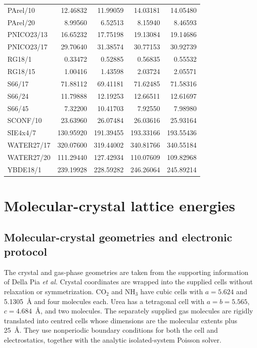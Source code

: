 \documentclass[10pt,a4paper]{article}
\begin{document}
{\begin{longtable}{@{}lrrrr@{}}
PArel/10 & 12.46832 & 11.99059 & 14.03181 & 14.05480 \\
PArel/20 & 8.99560 & 6.52513 & 8.15940 & 8.46593 \\
PNICO23/13 & 16.65232 & 17.75198 & 19.13084 & 19.14686 \\
PNICO23/17 & 29.70640 & 31.38574 & 30.77153 & 30.92739 \\
RG18/1 & 0.33472 & 0.52885 & 0.56835 & 0.55532 \\
RG18/15 & 1.00416 & 1.43598 & 2.03724 & 2.05571 \\
S66/17 & 71.88112 & 69.41181 & 71.62485 & 71.58316 \\
S66/24 & 11.79888 & 12.19253 & 12.66511 & 12.61697 \\
S66/45 & 7.32200 & 10.41703 & 7.92550 & 7.98980 \\
SCONF/10 & 23.63960 & 26.07484 & 26.03616 & 25.93164 \\
SIE4x4/7 & 130.95920 & 191.39455 & 193.33166 & 193.55436 \\
WATER27/17 & 320.07600 & 319.44002 & 340.81766 & 340.55184 \\
WATER27/20 & 111.29440 & 127.42934 & 110.07609 & 109.82968 \\
YBDE18/1 & 239.19928 & 228.59282 & 246.26064 & 245.89214 \\
\bottomrule
\end{longtable}
}


\FloatBarrier

\section{Molecular-crystal lattice energies}
\label{sec:x23_si}

\subsection{Molecular-crystal geometries and electronic protocol}
\label{sec:crystal-protocol}

The crystal and gas-phase geometries are taken from the supporting information of Della Pia \emph{et al.}\cite{DellaPia2024X23} Crystal coordinates are wrapped into the supplied cells without relaxation or symmetrization. CO$_2$ and NH$_3$ have cubic cells with $a=5.624$ and 5.1305~\AA{} and four molecules each. Urea has a tetragonal cell with $a=b=5.565$, $c=4.684$~\AA{}, and two molecules. The separately supplied gas molecules are rigidly translated into centred cells whose dimensions are the molecular extents plus 25~\AA{}. They use nonperiodic boundary conditions for both the cell and electrostatics, together with the analytic isolated-system Poisson solver.
\end{document}
